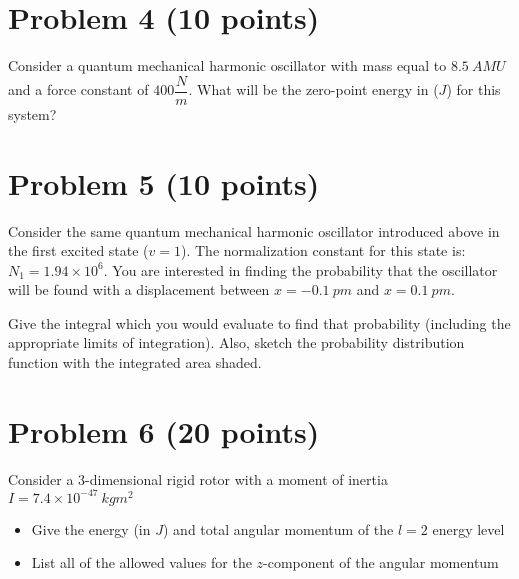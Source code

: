 \documentclass[10pt, letterpaper]{memoir}
\begin{document}
	\section*{Problem 4 (10 points)}
	Consider a quantum mechanical harmonic oscillator with mass equal to $8.5~AMU$ and a force constant of $400\dfrac{N}{m}$. What will be the zero-point energy in ($J$) for this system?


	\vspace{25em}
	\section*{Problem 5 (10 points)}
	Consider the same quantum mechanical harmonic oscillator introduced above in the first excited state ($v=1$). The normalization constant for this state is: $N_1=1.94\times10^6$. You are interested in finding the probability that the oscillator will be found with a displacement between $x=-0.1~pm$ and $x=0.1~pm$.
	
	\noindent Give the integral which you would evaluate to find that probability (including the appropriate limits of integration). Also, sketch the probability distribution function with the integrated area shaded.
	
	\vspace{25em}
	\section*{Problem 6 (20 points)}
	Consider a 3-dimensional rigid rotor with a moment of inertia $I=7.4\times10^{-47}~kgm^2$
	
	\begin{itemize}
		\item Give the energy (in $J$) and total angular momentum of the $l=2$ energy level
		
		\vspace{15em}
		\item List all of  the allowed values for the $z$-component of the angular momentum
	\end{itemize}
\end{document}
